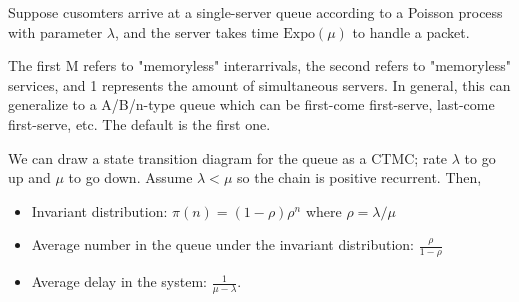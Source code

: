 \begin{example}[M/M/1 Queue]
    Suppose cusomters arrive at a single-server queue according to a Poisson process with parameter $\lambda$,
    and the server takes time $\text{Expo}(\mu)$ to handle a packet. 
    
    The first M refers to "memoryless" interarrivals, the second
    refers to "memoryless" services, and 1 represents the amount of simultaneous servers. In general, this can generalize to a
    A/B/n-type queue which can be first-come first-serve, last-come first-serve, etc. The default is the first one.

    We can draw a state transition diagram for the queue as a CTMC; rate $\lambda$ to go up and $\mu$ to go down.
    Assume $\lambda < \mu$ so the chain is positive recurrent. Then,
    \begin{itemize}
        \item Invariant distribution: $\pi(n) = (1 - \rho) \rho^n$ where $\rho = \lambda / \mu$
        \item Average number in the queue under the invariant distribution: $\frac{\rho}{1 - \rho}$
        \item Average delay in the system: $\frac{1}{\mu - \lambda}$.
    \end{itemize}
\end{example}